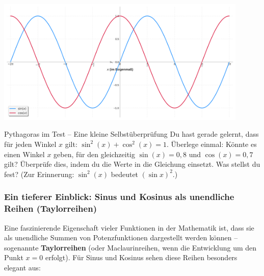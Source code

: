 \begin{center}
    \includegraphics[width=0.9\textwidth]{grafiken/Trig_SinCos_Graphen.png}
    \label{fig:sincos_graphen}
\end{center}




\begin{tippumgebung}{Pythagoras im Test – Eine kleine Selbstüberprüfung}
Du hast gerade gelernt, dass für jeden Winkel $x$ gilt: $\sin^2(x) + \cos^2(x) = 1$.
Überlege einmal: Könnte es einen Winkel $x$ geben, für den gleichzeitig $\sin(x) = 0,8$ und $\cos(x) = 0,7$ gilt? Überprüfe dies, indem du die Werte in die Gleichung einsetzt. Was stellst du fest?
(Zur Erinnerung: $\sin^2(x)$ bedeutet $(\sin x)^2$.)
\end{tippumgebung}

\subsubsection{Ein tieferer Einblick: Sinus und Kosinus als unendliche Reihen (Taylorreihen)}
Eine faszinierende Eigenschaft vieler Funktionen in der Mathematik ist, dass sie als unendliche Summen von Potenzfunktionen dargestellt werden können – sogenannte \textbf{Taylorreihen} (oder Maclaurinreihen, wenn die Entwicklung um den Punkt $x=0$ erfolgt). Für Sinus und Kosinus sehen diese Reihen besonders elegant aus:

